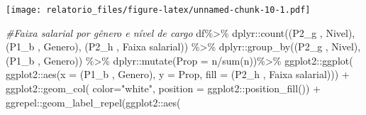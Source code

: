 \documentclass[
]{article}
\newenvironment{Shaded}{\begin{snugshade}}{\end{snugshade}}
\newcommand{\AttributeTok}[1]{\textcolor[rgb]{0.77,0.63,0.00}{#1}}
\newcommand{\CommentTok}[1]{\textcolor[rgb]{0.56,0.35,0.01}{\textit{#1}}}
\newcommand{\FunctionTok}[1]{\textcolor[rgb]{0.00,0.00,0.00}{#1}}
\newcommand{\NormalTok}[1]{#1}
\newcommand{\SpecialCharTok}[1]{\textcolor[rgb]{0.00,0.00,0.00}{#1}}
\newcommand{\StringTok}[1]{\textcolor[rgb]{0.31,0.60,0.02}{#1}}
\begin{document}
\texttt{[image: relatorio\_files/figure-latex/unnamed-chunk-10-1.pdf]}

\begin{Shaded}
\begin{Highlighting}[]
\CommentTok{\#Faixa salarial por gênero e nível de cargo}
\NormalTok{df}\SpecialCharTok{\%\textgreater{}\%}
\NormalTok{  dplyr}\SpecialCharTok{::}\FunctionTok{count}\NormalTok{(}\StringTok{\textasciigrave{}}\AttributeTok{(\textquotesingle{}P2\_g \textquotesingle{}, \textquotesingle{}Nivel\textquotesingle{})}\StringTok{\textasciigrave{}}\NormalTok{,}\StringTok{\textasciigrave{}}\AttributeTok{(\textquotesingle{}P1\_b \textquotesingle{}, \textquotesingle{}Genero\textquotesingle{})}\StringTok{\textasciigrave{}}\NormalTok{, }\StringTok{\textasciigrave{}}\AttributeTok{(\textquotesingle{}P2\_h \textquotesingle{}, \textquotesingle{}Faixa salarial\textquotesingle{})}\StringTok{\textasciigrave{}}\NormalTok{) }\SpecialCharTok{\%\textgreater{}\%}
\NormalTok{  dplyr}\SpecialCharTok{::}\FunctionTok{group\_by}\NormalTok{(}\StringTok{\textasciigrave{}}\AttributeTok{(\textquotesingle{}P2\_g \textquotesingle{}, \textquotesingle{}Nivel\textquotesingle{})}\StringTok{\textasciigrave{}}\NormalTok{,}\StringTok{\textasciigrave{}}\AttributeTok{(\textquotesingle{}P1\_b \textquotesingle{}, \textquotesingle{}Genero\textquotesingle{})}\StringTok{\textasciigrave{}}\NormalTok{) }\SpecialCharTok{\%\textgreater{}\%}
\NormalTok{  dplyr}\SpecialCharTok{::}\FunctionTok{mutate}\NormalTok{(}\AttributeTok{Prop =}\NormalTok{ n}\SpecialCharTok{/}\FunctionTok{sum}\NormalTok{(n))}\SpecialCharTok{\%\textgreater{}\%}
\NormalTok{  ggplot2}\SpecialCharTok{::}\FunctionTok{ggplot}\NormalTok{(}
\NormalTok{    ggplot2}\SpecialCharTok{::}\FunctionTok{aes}\NormalTok{(}\AttributeTok{x =} \StringTok{\textasciigrave{}}\AttributeTok{(\textquotesingle{}P1\_b \textquotesingle{}, \textquotesingle{}Genero\textquotesingle{})}\StringTok{\textasciigrave{}}\NormalTok{, }\AttributeTok{y =}\NormalTok{ Prop,}
                 \AttributeTok{fill =} \StringTok{\textasciigrave{}}\AttributeTok{(\textquotesingle{}P2\_h \textquotesingle{}, \textquotesingle{}Faixa salarial\textquotesingle{})}\StringTok{\textasciigrave{}}\NormalTok{)) }\SpecialCharTok{+}
\NormalTok{  ggplot2}\SpecialCharTok{::}\FunctionTok{geom\_col}\NormalTok{( }\AttributeTok{color=}\StringTok{"white"}\NormalTok{,}
                     \AttributeTok{position =}\NormalTok{ ggplot2}\SpecialCharTok{::}\FunctionTok{position\_fill}\NormalTok{()) }\SpecialCharTok{+}
\NormalTok{  ggrepel}\SpecialCharTok{::}\FunctionTok{geom\_label\_repel}\NormalTok{(ggplot2}\SpecialCharTok{::}\FunctionTok{aes}\NormalTok{(}

\end{Highlighting}
\end{Shaded}
\end{document}
